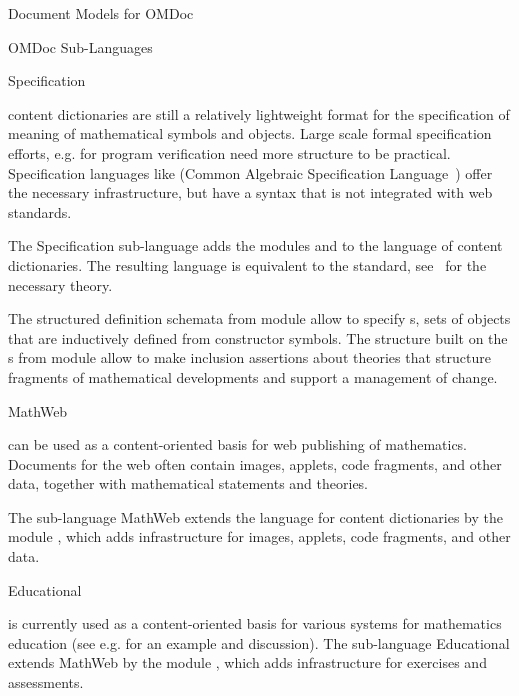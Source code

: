 \begin{tchapter}[id=document-model]{Document Models for OMDoc}
\begin{tsection}[id=sub-languages]{OMDoc Sub-Languages}
\begin{tsubsection}[id=sub-languages:spec]{Specification {\omdoc}}
 
  {\omdoc} content dictionaries are still a relatively lightweight format for the
  specification of meaning of mathematical symbols and objects. Large scale formal
  specification efforts, e.g. for program verification need more structure to be
  practical. Specification languages like {\casl} (Common Algebraic
  Specification Language~\cite{CoFI:2004:CASL-RM}) offer the
  necessary infrastructure, but have a syntax that is not integrated with web standards.

  The Specification {\omdoc} sub-language adds the modules {} and
  {} to the language of {\omdoc} content dictionaries. The resulting
  language is equivalent to the {\casl} standard,
  see~\cite{AutHut:tefsduc00,Hutter:mocsv00,MAH-06-a} for the necessary theory.

The structured definition schemata from module {} allow to specify
{s}, sets of objects that are inductively defined from
constructor symbols. The {} structure built on the
{s} from module {} allow to make inclusion
assertions about theories that structure fragments of mathematical developments and
support a management of change.
\end{tsubsection}

\begin{tsubsection}[id=sub-languages:mathwebomdoc]{MathWeb {\omdoc}}

{\omdoc} can be used as a content-oriented basis for web publishing of
mathematics. Documents for the web often contain images, applets, code fragments,
and other data, together with mathematical statements and theories.

The {\omdoc} sub-language MathWeb {\omdoc} extends
the language for {\omdoc} content dictionaries by the module {},
which adds infrastructure for images, applets, code fragments, and other data.
\end{tsubsection}

\begin{tsubsection}[id=sub-languages:web]{Educational {\omdoc}}
  
  {\omdoc} is currently used as a content-oriented basis for various systems for
  mathematics education (see e.g. {} for an example and discussion).
  The {\omdoc} sub-language Educational {\omdoc}
  extends MathWeb {\omdoc} by the module {}, which adds
  infrastructure for exercises and assessments.
\end{tsubsection}


\end{tsection}
\end{tchapter}
